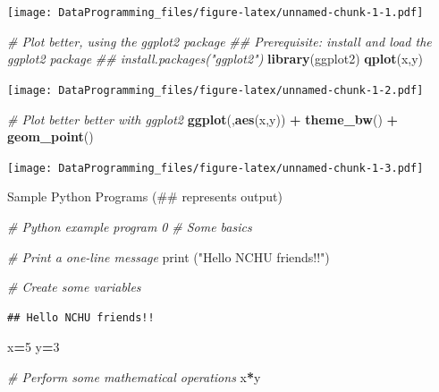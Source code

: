 \documentclass[]{book}
\newenvironment{Shaded}{\begin{snugshade}}{\end{snugshade}}
\newcommand{\BuiltInTok}[1]{#1}
\newcommand{\CommentTok}[1]{\textcolor[rgb]{0.56,0.35,0.01}{\textit{#1}}}
\newcommand{\DecValTok}[1]{\textcolor[rgb]{0.00,0.00,0.81}{#1}}
\newcommand{\KeywordTok}[1]{\textcolor[rgb]{0.13,0.29,0.53}{\textbf{#1}}}
\newcommand{\NormalTok}[1]{#1}
\newcommand{\OperatorTok}[1]{\textcolor[rgb]{0.81,0.36,0.00}{\textbf{#1}}}
\newcommand{\StringTok}[1]{\textcolor[rgb]{0.31,0.60,0.02}{#1}}
\begin{document}
\texttt{[image: DataProgramming\_files/figure-latex/unnamed-chunk-1-1.pdf]}

\begin{Shaded}
\begin{Highlighting}[]
\CommentTok{# Plot better, using the ggplot2 package }
\CommentTok{## Prerequisite: install and load the ggplot2 package}
\CommentTok{## install.packages("ggplot2")}
\KeywordTok{library}\NormalTok{(ggplot2)}
\KeywordTok{qplot}\NormalTok{(x,y)}
\end{Highlighting}
\end{Shaded}

\texttt{[image: DataProgramming\_files/figure-latex/unnamed-chunk-1-2.pdf]}

\begin{Shaded}
\begin{Highlighting}[]
\CommentTok{# Plot better better with ggplot2}
\KeywordTok{ggplot}\NormalTok{(,}\KeywordTok{aes}\NormalTok{(x,y)) }\OperatorTok{+}\StringTok{ }\KeywordTok{theme_bw}\NormalTok{() }\OperatorTok{+}\StringTok{ }\KeywordTok{geom_point}\NormalTok{()}
\end{Highlighting}
\end{Shaded}

\texttt{[image: DataProgramming\_files/figure-latex/unnamed-chunk-1-3.pdf]}

Sample Python Programs (\#\# represents output)

\begin{Shaded}
\begin{Highlighting}[]
\CommentTok{# Python example program 0}
\CommentTok{# Some basics}

\CommentTok{# Print a one-line message}
\BuiltInTok{print}\NormalTok{ (}\StringTok{"Hello NCHU friends!!"}\NormalTok{)}

\CommentTok{# Create some variables}
\end{Highlighting}
\end{Shaded}

\begin{verbatim}
## Hello NCHU friends!!
\end{verbatim}

\begin{Shaded}
\begin{Highlighting}[]
\NormalTok{x}\OperatorTok{=}\DecValTok{5}
\NormalTok{y}\OperatorTok{=}\DecValTok{3}

\CommentTok{# Perform some mathematical operations}
\NormalTok{x}\OperatorTok{*}\NormalTok{y}
\end{Highlighting}
\end{Shaded}
\end{document}
